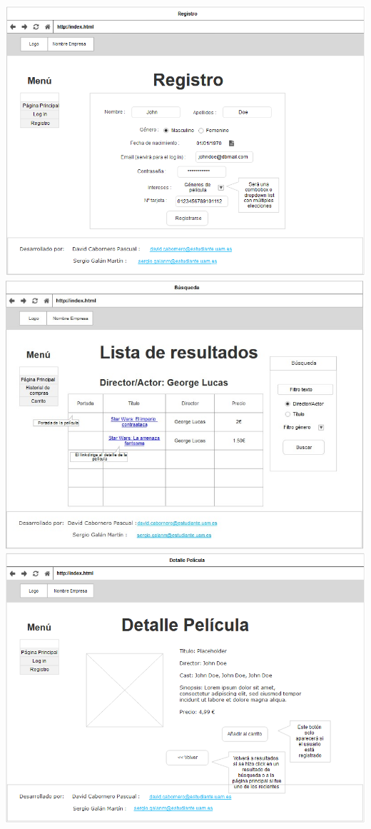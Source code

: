 \documentclass[]{article}
\begin{document}
\begin{center}
\includegraphics[scale=0.5]{mockup/Registro.png}
\includegraphics[scale=0.4]{mockup/Lista.jpeg}
\includegraphics[scale=0.5]{mockup/DetallePelicula.png}

\end{center}
\end{document}
